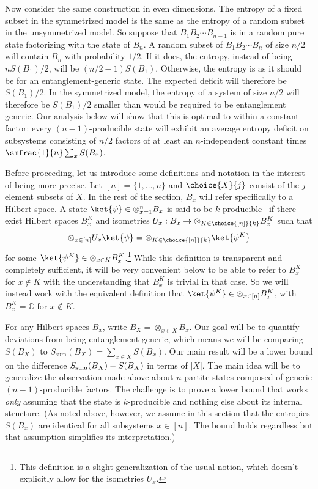 \documentclass[12pt]{article}
\newcommand{\be}{\begin{equation}}
\newcommand{\ee}{\end{equation}}
\def\Sadd{{S_{\text{sum}}}}
\numberwithin{equation}{section}
\begin{document}
Now consider the same construction in even dimensions. The entropy of a fixed subset in the symmetrized model is the same as the entropy of a random subset in the unsymmetrized model. So suppose that $B_1 B_2\cdots B_{n-1}$ is in a random pure state factorizing with the state of $B_n$. A random subset of $B_1 B_2 \cdots B_n$ of size $n/2$ will contain $B_n$ with probability $1/2$. If it does, the entropy, instead of being $nS(B_1)/2$, will be $(n/2 - 1)S(B_1)$. Otherwise, the entropy is as it should be for an entanglement-generic state. The expected deficit will therefore be $S(B_1)/2$. In the symmetrized model, the entropy of a system of size $n/2$ will therefore be $S(B_1)/2$ smaller than would be required to be entanglement generic. Our analysis below will show that this is optimal to within a constant factor: every $(n-1)$-producible state will exhibit an average entropy deficit on subsystems consisting of $n/2$ factors of at least an $n$-independent constant times $\smfrac{1}{n} \sum_x S(B_x)$.

Before proceeding, let us introduce some definitions and notation in the interest of being more precise. Let $[n] = \{1,\ldots,n\}$ and $\choice{X}{j}$ consist of the $j$-element subsets of $X$. In the rest of the section, $B_x$ will refer specifically to a Hilbert space. A state $\ket{\psi} \in \otimes_{x=1}^n B_x$ is said to be $k$-producible~\cite{guhne2005multipartite} if there exist Hilbert spaces $B_x^K$ and isometries $U_x : B_x \rightarrow \otimes_{K \in \choice{[n]}{k}} B_x^K$ such that
\be
\otimes _{x \in [n]} U_x \ket{\psi}
= \otimes_{K \in \choice{[n]}{k}} \ket{\psi^K}
\ee
for some $\ket{\psi^K} \in \otimes_{x \in K} B_x^K$.\footnote{This definition is a slight generalization of the usual notion, which doesn't explicitly allow for the isometries $U_x$.}
While this definition is transparent and completely sufficient, it will be very convenient below to be able to refer to $B_x^K$ for $x \not\in K$ with the understanding that $B_x^K$ is trivial in that case. So we will instead work with the equivalent definition that $\ket{\psi^K} \in \otimes_{x \in [n]} B_x^K$, with $B_x^K = \mathbb{C}$ for $x \not\in K$.

For any Hilbert spaces $B_x$, write $B_X = \otimes_{x \in X} B_x$. Our goal will be to quantify deviations from being entanglement-generic, which means we will be comparing $S(B_X)$ to $\Sadd(B_X) = \sum_{x \in X} S(B_x)$. Our main result will be a lower bound on the difference $S_{\rm{sum}}(B_X) - S(B_X)$ in terms of $|X|$. The main idea will be to generalize the observation made above about $n$-partite states composed of generic $(n-1)$-producible factors. The challenge is to prove a lower bound that works \emph{only} assuming that the state is $k$-producible and nothing else about its internal structure. (As noted above, however, we assume in this section that the entropies $S(B_x)$ are identical for all subsystems $x \in [n]$. The bound holds regardless but that assumption simplifies its interpretation.)
\end{document}
